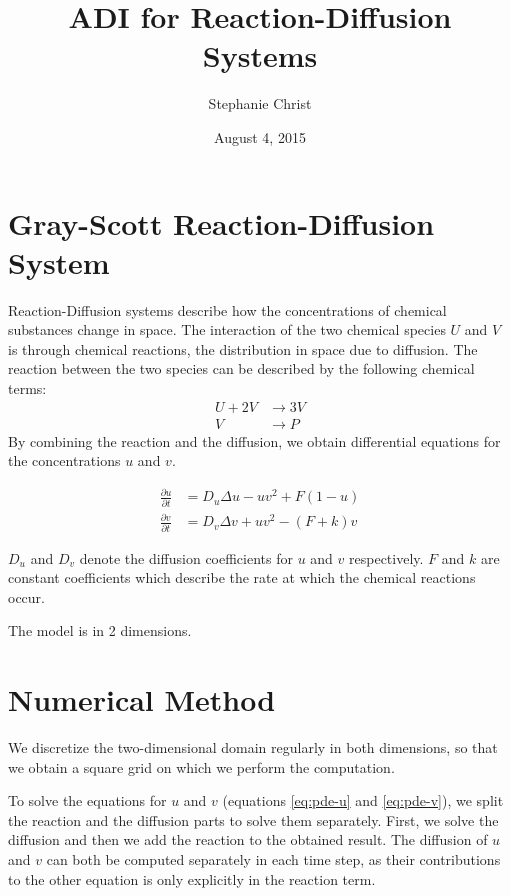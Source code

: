 \documentclass[a4paper]{article}
\title{ADI for Reaction-Diffusion Systems}
\author{Stephanie Christ}
\date{August 4, 2015}
\begin{document}
\maketitle


\section{Gray-Scott Reaction-Diffusion System}

Reaction-Diffusion systems describe how the concentrations of chemical substances change in space.
The interaction of the two chemical species $U$ and $V$ is through chemical reactions, the distribution in space due to diffusion.
The reaction between the two species can be described by the following chemical terms:
\begin{align*}
	U + 2V &\rightarrow 3V \\
	V &\rightarrow P
\end{align*}
By combining the reaction and the diffusion, we obtain differential equations for the concentrations $u$ and $v$.

\begin{align}
	\frac{\partial u}{\partial t} &= D_u \Delta u - uv^2 + F(1-u) \label{eq:pde-u}\\
	\frac{\partial v}{\partial t} &= D_v \Delta v + uv^2 - (F+k)v	 \label{eq:pde-v}
\end{align}

$D_u$ and $D_v$ denote the diffusion coefficients for $u$ and $v$ respectively.
$F$ and $k$ are constant coefficients which describe the rate at which the chemical reactions occur.

The model is in 2 dimensions.



\section{Numerical Method}

We discretize the two-dimensional domain regularly in both dimensions, so that we obtain a square grid on which we perform the computation.

To solve the equations for $u$ and $v$ (equations \ref{eq:pde-u} and \ref{eq:pde-v}), we split the reaction and the diffusion parts to solve them separately.
First, we solve the diffusion and then we add the reaction to the obtained result.
The diffusion of $u$ and $v$ can both be computed separately in each time step, as their contributions to the other equation is only explicitly in the reaction term.
\end{document}
